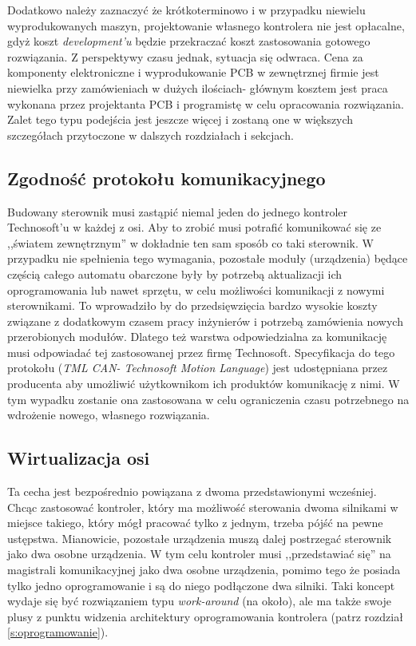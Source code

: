Dodatkowo należy zaznaczyć że krótkoterminowo i w przypadku niewielu wyprodukowanych maszyn, projektowanie własnego kontrolera nie jest opłacalne, gdyż koszt {\it development'u} będzie przekraczać koszt zastosowania gotowego rozwiązania. Z perspektywy czasu jednak, sytuacja się odwraca. Cena za komponenty elektroniczne i wyprodukowanie PCB w zewnętrznej firmie jest niewielka przy zamówieniach w dużych ilościach- głównym kosztem jest praca wykonana przez projektanta PCB i programistę w celu opracowania rozwiązania. Zalet tego typu podejścia jest jeszcze więcej i zostaną one w większych szczegółach przytoczone w dalszych rozdziałach i sekcjach.

\subsection{Zgodność protokołu komunikacyjnego}

Budowany sterownik musi zastąpić niemal jeden do jednego kontroler Technosoft'u w każdej z osi. Aby to zrobić musi potrafić komunikować się ze ,,światem zewnętrznym'' w dokładnie ten sam sposób co taki sterownik. W przypadku nie spełnienia tego wymagania, pozostałe moduły (urządzenia) będące częścią całego automatu obarczone były by potrzebą aktualizacji ich oprogramowania lub nawet sprzętu, w celu możliwości komunikacji z nowymi sterownikami. To wprowadziło by do przedsięwzięcia bardzo wysokie koszty związane z dodatkowym czasem pracy inżynierów i potrzebą zamówienia nowych przerobionych modułów. Dlatego też warstwa odpowiedzialna za komunikację musi odpowiadać tej zastosowanej przez firmę Technosoft. Specyfikacja do tego protokołu ({\it TML CAN- Technosoft Motion Language}) jest udostępniana przez producenta aby umożliwić użytkownikom ich produktów komunikację z nimi. W tym wypadku zostanie ona zastosowana w celu  ograniczenia czasu potrzebnego na wdrożenie nowego, własnego rozwiązania.

\subsection{Wirtualizacja osi}
\label{ss:axis_virtualisation}

Ta cecha jest bezpośrednio powiązana z dwoma przedstawionymi wcześniej. Chcąc zastosować kontroler, który ma możliwość sterowania dwoma silnikami w miejsce takiego, który mógł pracować tylko z jednym, trzeba pójść na pewne ustępstwa. Mianowicie, pozostałe urządzenia muszą dalej postrzegać sterownik jako dwa osobne urządzenia. W tym celu kontroler musi ,,przedstawiać się'' na magistrali komunikacyjnej jako dwa osobne urządzenia, pomimo tego że posiada tylko jedno oprogramowanie i są do niego podłączone dwa silniki. Taki koncept wydaje się być rozwiązaniem typu {\it work-around} (na około), ale ma także swoje plusy z punktu widzenia architektury oprogramowania kontrolera (patrz rozdział \ref{s:oprogramowanie}). \\

